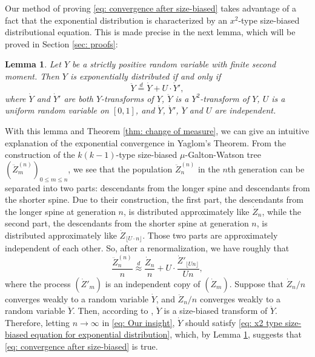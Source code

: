 \documentclass[UTF8]{pkuthss}
\theoremstyle{plain}
\newtheorem{lem}[thm]{Lemma}
\theoremstyle{definition}
\numberwithin{equation}{section}
\begin{document}
Our method of proving
\eqref{eq: convergence after size-biased}
takes advantage of a fact that the exponential distribution is characterized by an $x^2$-type size-biased distributional equation.
This is made precise in the next lemma, which will be proved in Section \ref{sec: proofs}:
\begin{lem} \label{lem: our equation}
	Let $Y$ be a strictly positive random variable with finite second moment.
	Then $Y$ is exponentially distributed if and only if
	\begin{equation}
	\label{eq: x2 type size-biased equation for exponential distribution}
	\ddot Y \overset{d}
	= \dot Y + U \cdot \dot Y',
	\end{equation}
	where $\dot Y$ and $\dot Y'$ are both $Y$-transforms of  $Y$,
	$\ddot Y$ is a $Y^2$-transform of $Y$,
	$U$ is a uniform random variable on $[0,1]$, and $\dot Y$, $\dot Y'$, $\ddot Y$
	and $U$ are independent.
\end{lem}	
	With this lemma and Theorem \ref{thm: change of measure}, we can give an intuitive explanation of the exponential convergence in Yaglom's Theorem.
	From the construction of the $k(k-1)$-type size-biased $\mu$-Galton-Watson tree $(\ddot Z^{(n)}_m)_{0\le m\le n}$, we see that the population $\ddot Z^{(n)}_n$ in the $n$th generation can be separated into two parts:
	descendants from the longer spine and descendants from the shorter spine.
	Due to their construction, the first part, the descendants from the longer spine at generation $n$, is distributed approximately like $\dot Z_n$, while the second part, the descendants from the shorter spine at generation $n$,
	is distributed approximately like $\dot Z_{ \lfloor U\cdot n \rfloor}$.
	Those two parts are approximately independent of each other.
	So, after a renormalization, we have roughly that
\begin{equation}
\label{eq: Our insight}
	\frac{\ddot Z_n^{(n)}}{n}
	 \overset{d} \approx \frac{\dot Z_n}{n} + U \cdot \frac{   \dot Z'_{  \lfloor U n \rfloor  }   }    {   Un   },
\end{equation}
where the process $(\dot Z'_m)$ is an independent copy of $(\dot Z_m)$.
Suppose that $\dot Z_n/n$ converges weakly to a random variable $\dot Y$, and $\ddot Z_n/n$ converges weakly to a random variable $\ddot Y$.
Then, according to \cite[Lemma 4.3]{LyonsPemantlePeres1995Conceptual}, $\ddot Y$ is a size-biased transform of $\dot Y$.
Therefore, letting $n\to\infty$ in \eqref{eq: Our insight},
$\dot Y$ should satisfy \eqref{eq: x2 type size-biased equation for exponential distribution}, which, by Lemma \ref{lem: our equation}, suggests that \eqref{eq: convergence after size-biased} is true.
\end{document}
